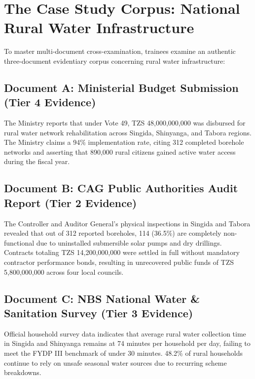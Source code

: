 \documentclass[11pt, a4paper]{report}
\begin{document}
\section{The Case Study Corpus: National Rural Water Infrastructure}
To master multi-document cross-examination, trainees examine an authentic three-document evidentiary corpus concerning rural water infrastructure:

\subsection{Document A: Ministerial Budget Submission (Tier 4 Evidence)}
The Ministry reports that under Vote 49, TZS 48,000,000,000 was disbursed for rural water network rehabilitation across Singida, Shinyanga, and Tabora regions. The Ministry claims a 94\% implementation rate, citing 312 completed borehole networks and asserting that 890,000 rural citizens gained active water access during the fiscal year.

\subsection{Document B: CAG Public Authorities Audit Report (Tier 2 Evidence)}
The Controller and Auditor General's physical inspections in Singida and Tabora revealed that out of 312 reported boreholes, 114 (36.5\%) are completely non-functional due to uninstalled submersible solar pumps and dry drillings. Contracts totaling TZS 14,200,000,000 were settled in full without mandatory contractor performance bonds, resulting in unrecovered public funds of TZS 5,800,000,000 across four local councils.

\subsection{Document C: NBS National Water \& Sanitation Survey (Tier 3 Evidence)}
Official household survey data indicates that average rural water collection time in Singida and Shinyanga remains at 74 minutes per household per day, failing to meet the FYDP III benchmark of under 30 minutes. 48.2\% of rural households continue to rely on unsafe seasonal water sources due to recurring scheme breakdowns.
\end{document}
